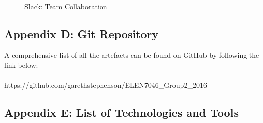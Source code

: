 \documentclass[12pt]{article} %
\begin{document}
		
	\begin{figure}[H] %
		\caption{Slack: Team Collaboration}
		\label{fig:speciation}
	\end{figure}
		
		\newpage
	
	\subsection{Appendix D: Git Repository}
	
	A comprehensive list of all the artefacts can be found on GitHub by following the link below:
	\\
	\\
	https://github.com/garethstephenson/ELEN7046\_Group2\_2016\\
	
	
	\newpage
	
	\subsection{Appendix E: List of Technologies and Tools}
	
\end{document}
